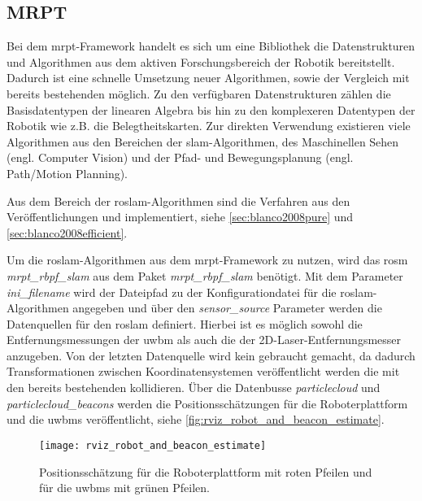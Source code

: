\subsection{MRPT}

Bei dem \Gls{mrpt}-Framework handelt es sich um eine Bibliothek die Datenstrukturen und Algorithmen aus dem aktiven Forschungsbereich der Robotik bereitstellt. Dadurch ist eine schnelle Umsetzung neuer Algorithmen, sowie der Vergleich mit bereits bestehenden möglich. Zu den verfügbaren Datenstrukturen zählen die Basisdatentypen der linearen Algebra bis hin zu den komplexeren Datentypen der Robotik wie z.B. die Belegtheitskarten. Zur direkten Verwendung existieren viele Algorithmen aus den Bereichen der \Gls{slam}-Algorithmen, des Maschinellen Sehen (engl. Computer Vision) und der Pfad- und Bewegungsplanung (engl. Path/Motion Planning).

Aus dem Bereich der \Gls{roslam}-Algorithmen sind die Verfahren aus den Veröffentlichungen  und  implementiert, siehe \autoref{sec:blanco2008pure} und \ref{sec:blanco2008efficient}.

Um die \Gls{roslam}-Algorithmen aus dem \Gls{mrpt}-Framework zu nutzen, wird das \Gls{rosm} \textit{mrpt\_rbpf\_slam} aus dem Paket \textit{mrpt\_rbpf\_slam} benötigt. Mit dem Parameter \textit{ini\_filename} wird der Dateipfad zu der Konfigurationdatei für die \Gls{roslam}-Algorithmen angegeben und über den \textit{sensor\_source} Parameter werden die Datenquellen für den \Gls{roslam} definiert. Hierbei ist es möglich sowohl die Entfernungsmessungen der \Gls{uwbm} als auch die der 2D-Laser-Entfernungsmesser anzugeben. Von der letzten Datenquelle wird kein gebraucht gemacht, da dadurch Transformationen zwischen Koordinatensystemen veröffentlicht werden die mit den bereits bestehenden kollidieren. Über die Datenbusse \textit{particlecloud} und \textit{particlecloud\_beacons} werden die Positionsschätzungen für die Roboterplattform und die \Glspl{uwbm} veröffentlicht, siehe \autoref{fig:rviz_robot_and_beacon_estimate}.

\begin{figure}
	\centering
	\texttt{[image: rviz\_robot\_and\_beacon\_estimate]}
	\caption{Positionsschätzung für die Roboterplattform mit roten Pfeilen und für die \Glspl{uwbm} mit grünen Pfeilen.}
	\label{fig:rviz_robot_and_beacon_estimate}
\end{figure}

